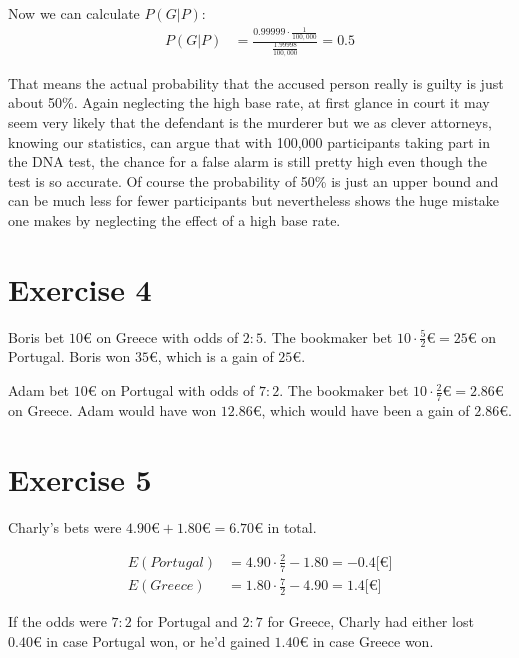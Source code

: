 Now we can calculate $P(G|P)$:
\begin{align*}
P(G|P) &= \frac{0.99999 \cdot \frac{1}{100,000}}{\frac{1.99998}{100,000}} = 0.5
\end{align*}

That means the actual probability that the accused person really is guilty is just about 50\%. Again neglecting the high base rate, at first glance in court  it may seem very likely that the defendant is the murderer but we as clever attorneys, knowing our statistics, can argue that with 100,000 participants taking part in the DNA test, the chance for a false alarm is still pretty high even though the test is so accurate. Of course the probability of 50\% is just an upper bound and can be much less for fewer participants but nevertheless shows the huge mistake one makes by neglecting the effect of a high base rate.  
 

\section*{Exercise 4}
Boris bet $10\euro$ on Greece with odds of $2 : 5$. The bookmaker bet $10\cdot\frac{5}{2}\euro=25\euro$ on Portugal. Boris won $35\euro$, which is a gain of $25\euro$.

Adam bet $10\euro$ on Portugal with odds of $7 : 2$. The bookmaker bet $10\cdot\frac{2}{7}\euro=2.86\euro$ on Greece. Adam would have won $12.86\euro$, which would have been a gain of $2.86\euro$.

\section*{Exercise 5}
Charly's bets were $4.90\euro+1.80\euro=6.70\euro$ in total.

\begin{align*}
E(Portugal) &= 4.90 \cdot \frac{2}{7} - 1.80 = -0.4 {[}\euro{]} \\
E(Greece)   &= 1.80 \cdot \frac{7}{2} - 4.90 =  1.4 {[}\euro{]}
\end{align*}

If the odds were $7 : 2$ for Portugal and $2 : 7$ for Greece, Charly had either lost $0.40\euro$ in case Portugal won, or he'd gained $1.40\euro$ in case Greece won.

